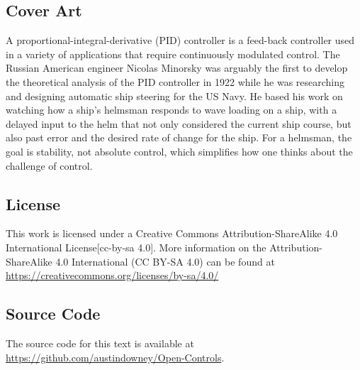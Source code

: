 \documentclass[12pt,letter]{article}
\begin{document}
\subsection*{Cover Art}
A proportional-integral-derivative (PID) controller is a feed-back controller used in a variety of applications that require continuously modulated control. The Russian American engineer Nicolas Minorsky was arguably the first to develop the theoretical analysis of the PID controller in 1922  while he was researching and designing automatic ship steering for the US Navy. He based his work on watching how a ship's helmsman responds to wave loading on a ship, with a delayed input to the helm that not only considered the current ship course, but also past error and the desired rate of change for the ship. For a helmsman, the goal is stability, not absolute control, which simplifies how one thinks about the challenge of control.

\subsection*{License}
This work is licensed under a Creative Commons Attribution-ShareAlike 4.0 International License[cc-by-sa 4.0]. More information on the Attribution-ShareAlike 4.0 International (CC BY-SA 4.0) can be found at  \url{https://creativecommons.org/licenses/by-sa/4.0/}

\subsection*{Source Code}
The source code for this text is available at \url{https://github.com/austindowney/Open-Controls}.


\pagebreak

\tableofcontents

\pagebreak

\graphicspath{{Chapter_1_Basic_Concepts/}}









\end{document}
